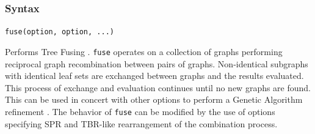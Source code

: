 	\subsubsection{Syntax}
		\texttt{fuse(option, option, ...)}
		
	\begin{phygdescription}
		{Performs Tree Fusing \citep{goloboff1999, moilanen1999, moilanen2001}. \texttt{fuse} 
		operates on a collection of graphs performing reciprocal graph recombination between 
		pairs of graphs. Non-identical subgraphs with identical leaf sets are exchanged between 
		graphs and the 	results evaluated. This process of exchange and evaluation continues 
		until no new graphs are found.
		This can be used in concert with other options to perform a Genetic Algorithm refinement
		\citep{Holland1975}. The behavior of \texttt{fuse} can be modified by the use of options 
		specifying SPR and TBR-like rearrangement of the combination process.}
	\end{phygdescription}
	
